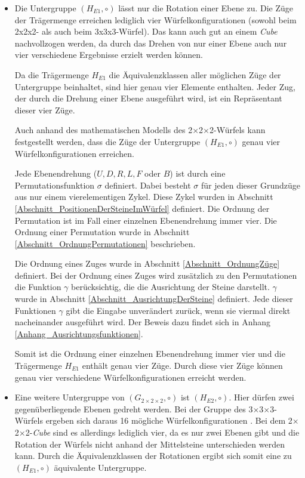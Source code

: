 \documentclass[12pt,a4paper, usenames, dvipsnames]{article}
\theoremstyle{mystyle}
\theoremstyle{definition}
\newcommand{\Gtwo}{\ensuremath{G_{2\times 2\times 2}}}
\newcommand{\Ttwo}{2$\times$2$\times$2-}
\newcommand{\Tthree}{3$\times$3$\times$3-}
\begin{document}
\begin{itemize}
\item Die Untergruppe $(H_{E1}, \circ)$ lässt nur die Rotation einer Ebene zu. Die Züge der Trägermenge erreichen lediglich vier Würfelkonfigurationen (sowohl beim 2x2x2- als auch beim 3x3x3-Würfel). Das kann auch gut an einem \textit{Cube} nachvollzogen werden, da durch das Drehen von nur einer Ebene auch nur vier verschiedene Ergebnisse erzielt werden können.

Da die Trägermenge $H_{E1}$ die Äquivalenzklassen aller möglichen Züge der Untergruppe beinhaltet, sind hier genau vier Elemente enthalten. Jeder Zug, der durch die Drehung einer Ebene ausgeführt wird, ist ein Repräsentant dieser vier Züge.

Auch anhand des mathematischen Modells des \Ttwo Würfels kann festgestellt werden, dass die Züge der Untergruppe $(H_{E1}, \circ)$ genau vier Würfelkonfigurationen erreichen.

Jede Ebenendrehung ($U, D, R, L, F$ oder $B$) ist durch eine Permutationsfunktion $\sigma$ definiert. Dabei besteht $\sigma$ für jeden dieser Grundzüge aus nur einem vierelementigen Zykel. Diese Zykel wurden in Abschnitt \ref{Abschnitt_PositionenDerSteineImWürfel} definiert. Die Ordnung der Permutation ist im Fall einer einzelnen Ebenendrehung immer vier. Die Ordnung einer Permutation wurde in Abschnitt \ref{Abschnitt_OrdnungPermutationen} beschrieben.

Die Ordnung eines Zuges wurde in Abschnitt \ref{Abschnitt_OrdnungZüge} definiert. Bei der Ordnung eines Zuges wird zusätzlich zu den Permutationen die Funktion $\gamma$ berücksichtig, die die Ausrichtung der Steine darstellt. $\gamma$ wurde in Abschnitt \ref{Abschnitt_AusrichtungDerSteine} definiert. Jede dieser Funktionen $\gamma$ gibt die Eingabe unverändert zurück, wenn sie viermal direkt nacheinander ausgeführt wird. Der Beweis dazu findet sich in Anhang \ref{Anhang_Ausrichtungsfunktionen}. 

Somit ist die Ordnung einer einzelnen Ebenendrehung immer vier und die Trägermenge $H_{E1}$ enthält genau vier Züge. Durch diese vier Züge können genau vier verschiedene Würfelkonfigurationen erreicht werden. 



\item Eine weitere Untergruppe von $(\Gtwo, \circ)$ ist $(H_{E2}, \circ)$. Hier dürfen zwei gegenüber\-liegende Ebenen gedreht werden. 
Bei der Gruppe des \Tthree Würfels ergeben sich daraus 16 mögliche Würfelkonfigurationen \cite{TD}. Bei dem \Ttwo \textit{Cube} sind es allerdings lediglich vier, da es nur zwei Ebenen gibt und die Rotation der Würfels nicht anhand der Mittelsteine unterschieden werden kann. Durch die Äquivalenzklassen der Rotationen ergibt sich somit eine zu $(H_{E1}, \circ)$ äquivalente Untergruppe.
\end{itemize}
\end{document}
